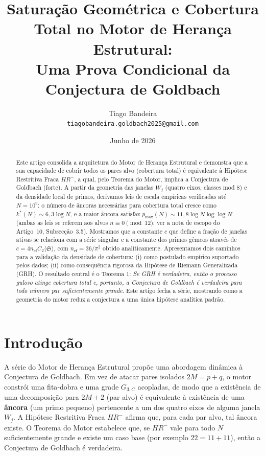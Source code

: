 \documentclass[11pt]{article}
\title{Saturação Geométrica e Cobertura Total no Motor de Herança Estrutural: \\
	Uma Prova Condicional da Conjectura de Goldbach}
\author{Tiago Bandeira \\ \texttt{tiagobandeira.goldbach2025@gmail.com}}
\date{Junho de 2026}
\theoremstyle{definition}
\begin{document}
	
	\maketitle
	
	\begin{abstract}
		Este artigo consolida a arquitetura do Motor de Herança Estrutural e demonstra que a sua capacidade de cobrir todos os pares alvo (cobertura total) é equivalente à Hipótese Restritiva Fraca $HR^-$, a qual, pelo Teorema do Motor, implica a Conjectura de Goldbach (forte). A partir da geometria das janelas $W_j$ (quatro eixos, classes mod 8) e da densidade local de primos, derivamos leis de escala empíricas verificadas até $N=10^9$: o número de âncoras necessárias para cobertura total cresce como $k^*(N) \sim 6{,}3\log N$, e a maior âncora satisfaz $p_{\max}(N) \sim 11{,}8 \log N \log\log N$ (ambas as leis se referem aos alvos $n\equiv0\pmod{12}$; ver a nota de escopo do Artigo~10, Subsecção~3.5). Mostramos que a constante $c$ que define a fração de janelas ativas se relaciona com a série singular e a constante dos primos gêmeos através de $c = 4 n_{\text{ef}} C_2 \langle\mathfrak{S}\rangle$, com $n_{\text{ef}} = 36/\pi^2$ obtido analiticamente. Apresentamos dois caminhos para a validação da densidade de cobertura: (i) como postulado empírico suportado pelos dados; (ii) como consequência rigorosa da Hipótese de Riemann Generalizada (GRH). O resultado central é o Teorema 1: \emph{Se GRH é verdadeira, então o processo guloso atinge cobertura total e, portanto, a Conjectura de Goldbach é verdadeira para todo número par suficientemente grande}. Este artigo fecha a série, mostrando como a geometria do motor reduz a conjectura a uma única hipótese analítica padrão.
	\end{abstract}
	
	\section{Introdução}
	
	A série do Motor de Herança Estrutural \cite{art1,art2,art3,art4,art5,art6,art7,art8,art9,art10,art11} propõe uma abordagem dinâmica à Conjectura de Goldbach. Em vez de atacar pares isolados $2M = p+q$, o motor constrói uma fita‑dobra e uma grade $G_{3,C}$ acopladas, de modo que a existência de uma decomposição para $2M+2$ (par alvo) é equivalente à existência de uma \textbf{âncora} (um primo pequeno) pertencente a um dos quatro eixos de alguma janela $W_j$. A Hipótese Restritiva Fraca $HR^-$ afirma que, para cada par alvo, tal âncora existe. O Teorema do Motor \cite{art7} estabelece que, se $HR^-$ vale para todo $N$ suficientemente grande e existe um caso base (por exemplo $22=11+11$), então a Conjectura de Goldbach é verdadeira.
	
\end{document}
